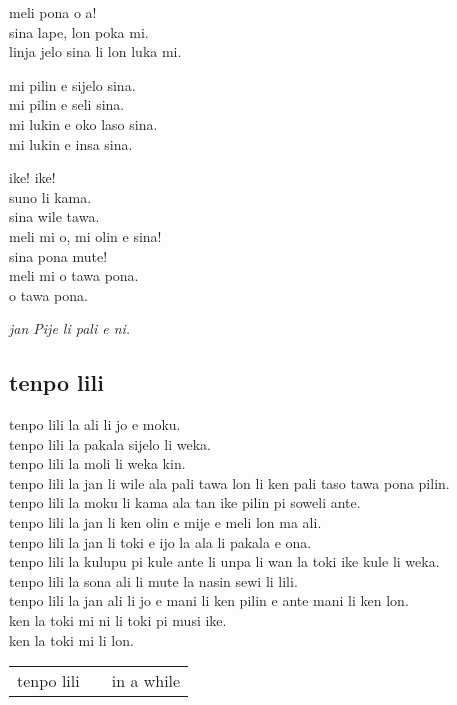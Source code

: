 meli pona o a! \\
sina lape, lon poka mi. \\
linja jelo sina li lon luka mi. 

mi pilin e sijelo sina. \\
mi pilin e seli sina. \\
mi lukin e oko laso sina. \\
mi lukin e insa sina. 

ike! ike! \\
suno li kama. \\
sina wile tawa. \\
meli mi o, mi olin e sina! \\
sina pona mute! \\
meli mi o tawa pona. \\
o tawa pona. 

\textit{jan Pije li pali e ni. \cite{www:Pije:01}}
%
\newpage
\subsection{tenpo lili}

tenpo lili la ali li jo e moku.     \\
tenpo lili la pakala sijelo li weka.     \\
tenpo lili la moli li weka kin.     \\
tenpo lili la jan li wile ala pali tawa lon li ken pali taso tawa pona
pilin.     \\
tenpo lili la moku li kama ala tan ike pilin pi soweli ante.     \\
tenpo lili la jan li ken olin e mije e meli lon ma ali.     \\
tenpo lili la jan li toki e ijo la ala li pakala e ona.     \\
tenpo lili la kulupu pi kule ante li unpa li wan la toki ike kule li
weka. \\
tenpo lili la sona ali li mute la nasin sewi li lili.     \\
tenpo lili la jan ali li jo e mani li ken pilin e ante mani li ken lon.     \\
ken la toki mi ni li toki pi musi ike.     \\
ken la toki mi li lon.

\begin{supertabular}{p{5,5cm}|ll}
tenpo lili && in a while \\
\end{supertabular}

